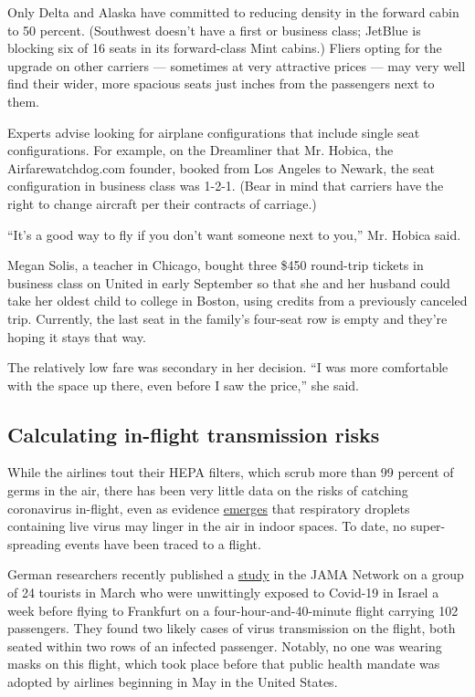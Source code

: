 Only Delta and Alaska have committed to reducing density in the forward
cabin to 50 percent. (Southwest doesn't have a first or business class;
JetBlue is blocking six of 16 seats in its forward-class Mint cabins.)
Fliers opting for the upgrade on other carriers --- sometimes at very
attractive prices --- may very well find their wider, more spacious
seats just inches from the passengers next to them.

Experts advise looking for airplane configurations that include single
seat configurations. For example, on the Dreamliner that Mr. Hobica, the
Airfarewatchdog.com founder, booked from Los Angeles to Newark, the seat
configuration in business class was 1-2-1. (Bear in mind that carriers
have the right to change aircraft per their contracts of carriage.)

``It's a good way to fly if you don't want someone next to you,'' Mr.
Hobica said.

Megan Solis, a teacher in Chicago, bought three \$450 round-trip tickets
in business class on United in early September so that she and her
husband could take her oldest child to college in Boston, using credits
from a previously canceled trip. Currently, the last seat in the
family's four-seat row is empty and they're hoping it stays that way.

The relatively low fare was secondary in her decision. ``I was more
comfortable with the space up there, even before I saw the price,'' she
said.

\hypertarget{calculating-in-flight-transmission-risks}{%
\subsection{Calculating in-flight transmission
risks}\label{calculating-in-flight-transmission-risks}}

While the airlines tout their HEPA filters, which scrub more than 99
percent of germs in the air, there has been very little data on the
risks of catching coronavirus in-flight, even as evidence
\href{https://www.nytimes3xbfgragh.onion/2020/08/11/health/coronavirus-aerosols-indoors.html}{emerges}
that respiratory droplets containing live virus may linger in the air in
indoor spaces. To date, no super-spreading events have been traced to a
flight.

German researchers recently published a
\href{https://jamanetwork.com/journals/jamanetworkopen/fullarticle/2769383}{study}
in the JAMA Network on a group of 24 tourists in March who were
unwittingly exposed to Covid-19 in Israel a week before flying to
Frankfurt on a four-hour-and-40-minute flight carrying 102 passengers.
They found two likely cases of virus transmission on the flight, both
seated within two rows of an infected passenger. Notably, no one was
wearing masks on this flight, which took place before that public health
mandate was adopted by airlines beginning in May in the United States.


